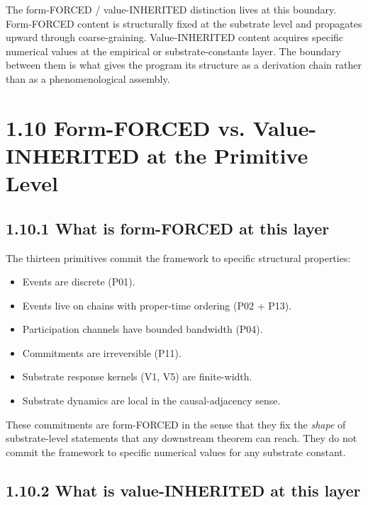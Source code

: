 \documentclass[11pt]{book}
\begin{document}
The form-FORCED / value-INHERITED distinction lives at this boundary. Form-FORCED content is structurally fixed at the substrate level and propagates upward through coarse-graining. Value-INHERITED content acquires specific numerical values at the empirical or substrate-constants layer. The boundary between them is what gives the program its structure as a derivation chain rather than as a phenomenological assembly.

\section{1.10 Form-FORCED vs. Value-INHERITED at the Primitive Level}

\subsection{1.10.1 What is form-FORCED at this layer}

The thirteen primitives commit the framework to specific structural properties:
\begin{itemize}
\item Events are discrete (P01).
\item Events live on chains with proper-time ordering (P02 + P13).
\item Participation channels have bounded bandwidth (P04).
\item Commitments are irreversible (P11).
\item Substrate response kernels (V1, V5) are finite-width.
\item Substrate dynamics are local in the causal-adjacency sense.
\end{itemize}

These commitments are form-FORCED in the sense that they fix the \textit{shape} of substrate-level statements that any downstream theorem can reach. They do not commit the framework to specific numerical values for any substrate constant.

\subsection{1.10.2 What is value-INHERITED at this layer}
\end{document}
